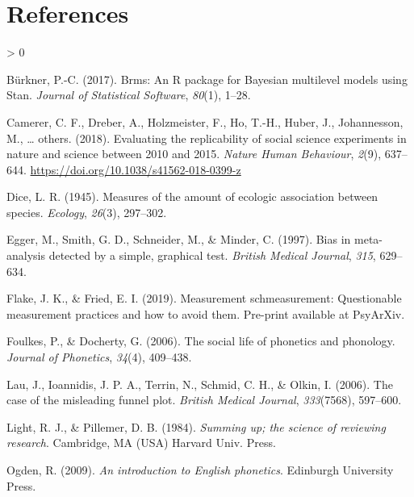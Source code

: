 \documentclass[
  english,
  man,floatsintext]{apa6}
\newlength{\cslhangindent}
\newenvironment{CSLReferences}[2] %
 {%
  \setlength{\parindent}{0pt}
  \ifodd #1 \everypar{\setlength{\hangindent}{\cslhangindent}}\ignorespaces\fi
  \ifnum #2 > 0
  \setlength{\parskip}{#2\baselineskip}
  \fi
 }%
 {}
\begin{document}
\newpage

\hypertarget{references}{%
\section{References}\label{references}}

\begingroup
\setlength{\parindent}{-0.5in}
\setlength{\leftskip}{0.5in}

\hypertarget{refs}{}
\begin{CSLReferences}{1}{0}
\leavevmode\hypertarget{ref-burkner2017}{}%
Bürkner, P.-C. (2017). Brms: An {R} package for {B}ayesian multilevel models using {S}tan. \emph{Journal of Statistical Software}, \emph{80}(1), 1--28.

\leavevmode\hypertarget{ref-camerer2018evaluating}{}%
Camerer, C. F., Dreber, A., Holzmeister, F., Ho, T.-H., Huber, J., Johannesson, M., \ldots{} others. (2018). Evaluating the replicability of social science experiments in nature and science between 2010 and 2015. \emph{Nature Human Behaviour}, \emph{2}(9), 637--644. \url{https://doi.org/10.1038/s41562-018-0399-z}

\leavevmode\hypertarget{ref-dice1945}{}%
Dice, L. R. (1945). Measures of the amount of ecologic association between species. \emph{Ecology}, \emph{26}(3), 297--302.

\leavevmode\hypertarget{ref-egger1997}{}%
Egger, M., Smith, G. D., Schneider, M., \& Minder, C. (1997). Bias in meta-analysis detected by a simple, graphical test. \emph{British Medical Journal}, \emph{315}, 629--634.

\leavevmode\hypertarget{ref-flake2019}{}%
Flake, J. K., \& Fried, E. I. (2019). Measurement schmeasurement: Questionable measurement practices and how to avoid them. Pre-print available at PsyArXiv.

\leavevmode\hypertarget{ref-foulkes2006}{}%
Foulkes, P., \& Docherty, G. (2006). The social life of phonetics and phonology. \emph{Journal of Phonetics}, \emph{34}(4), 409--438.

\leavevmode\hypertarget{ref-lau2006}{}%
Lau, J., Ioannidis, J. P. A., Terrin, N., Schmid, C. H., \& Olkin, I. (2006). The case of the misleading funnel plot. \emph{British Medical Journal}, \emph{333}(7568), 597--600.

\leavevmode\hypertarget{ref-light1984}{}%
Light, R. J., \& Pillemer, D. B. (1984). \emph{Summing up; the science of reviewing research}. Cambridge, MA (USA) Harvard Univ. Press.

\leavevmode\hypertarget{ref-ogden2009}{}%
Ogden, R. (2009). \emph{An introduction to {E}nglish phonetics}. Edinburgh University Press.


\end{CSLReferences}
\end{document}

